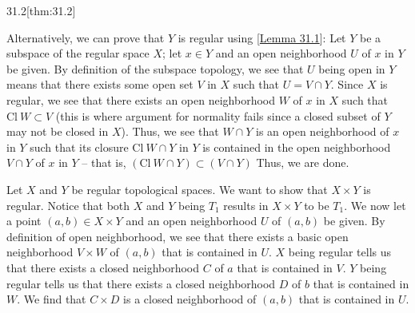 \begin{thmBox}{31.2}[thm:31.2]
\begin{proofBox}
        Alternatively, we can prove that \( Y \) is regular using 
        [\hyperlink{lem:31.1}{Lemma 31.1}]: Let \( Y \) be a subspace of the
        regular space \( X \); let \( x \in Y \) and an open neighborhood \( U \) of
        \( x \) in \( Y \) be given.
        By definition of the subspace topology, we see that \( U \) being open in
        \( Y \) means that there exists some open set \( V \) in \( X \) such that
        \( U = V \cap Y \).
        Since \( X \) is regular, we see that there exists an open neighborhood \( W \)
        of \( x \) in \( X \) such that \( \mathrm{Cl} \ W \subset V \) 
        (this is where argument
        for normality fails since a closed subset of \( Y \) may not be closed in 
        \( X \)).
        Thus, we see that \( W \cap Y \) is an open neighborhood of \( x \) in \( Y \) 
        such that
        its closure \( \mathrm{Cl} \ W \cap Y \) in \( Y \) is contained in the open 
        neighborhood \( V \cap Y \) of \( x \) in \( Y \) -- that is, 
        \( ( \mathrm{Cl} \ W \cap Y ) \subset ( V \cap Y ) \) 
        Thus, we are done.

        \baseSkip 
        
        Let \( X \) and \( Y \) be regular topological spaces.
        We want to show that \( X \times Y \) is regular.
        Notice that both \( X \) and \( Y \) being \( T_{ 1 } \) results in
        \( X \times Y \) to be \( T_{ 1 } \).
        We now let a point \( ( a, b ) \in X \times Y \) and an open neighborhood \( U \) of \( ( a, b ) \) be given.
        By definition of open neighborhood, we see that there exists a basic
        open neighborhood \( V \times W \) of \( ( a, b ) \) that is contained
        in \( U \).
        \( X \) being regular tells us that there exists a closed neighborhood
        \( C \) of \( a \) that is contained in \( V \).
        \( Y \) being regular tells us that there exists a closed neighborhood
        \( D \) of \( b \) that is contained in \( W \).
        We find that \( C \times D \) is a closed neighborhood of \( ( a, b ) \)
        that is contained in \( U \).
    \end{proofBox}
\end{thmBox}